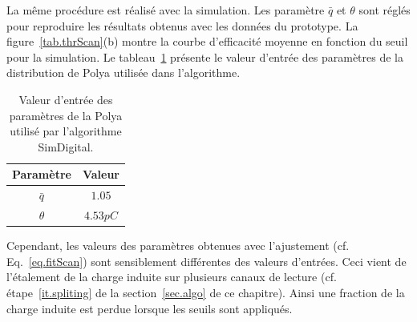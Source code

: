  La même procédure est réalisé avec la simulation. Les paramètre $\bar q$ et $\theta$ sont réglés pour reproduire les résultats obtenus avec les données du prototype. La figure~\ref{tab.thrScan}(b) montre la courbe d'efficacité moyenne en fonction du seuil pour la simulation. Le tableau~\ref{tab.inputPolya} présente le valeur d'entrée des paramètres de la distribution de Polya utilisée dans l'algorithme.
\begin{table}[!ht]
  \begin{center}
    \begin{tabular}{c|c}
      Paramètre & Valeur\\
      \hline
      $\bar q$ & $1.05$\\
      $\theta$ & $4.53 pC$\\
    \end{tabular}
  \end{center}
  \caption{Valeur d'entrée des paramètres de la Polya utilisé par l'algorithme SimDigital.}
  \label{tab.inputPolya}
\end{table}
 Cependant, les valeurs des paramètres obtenues avec l'ajustement (cf. Eq.~\ref{eq.fitScan}) sont sensiblement différentes des valeurs d'entrées. Ceci vient de l'étalement de la charge induite sur plusieurs canaux de lecture (cf. étape~\ref{it.spliting} de la section~\ref{sec.algo} de ce chapitre). Ainsi une fraction de la charge induite est perdue lorsque les seuils sont appliqués.

